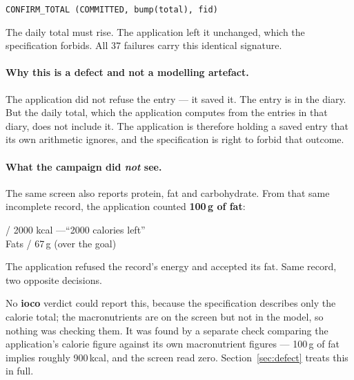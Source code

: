 \documentclass[11pt,a4paper]{article}
\newcommand{\gate}[1]{\texttt{\small #1}}
\begin{document}
\begin{center}
\gate{CONFIRM\_TOTAL (COMMITTED, bump(total), fid)}
\end{center}

\noindent The daily total must rise. The application left it unchanged, which the
specification forbids. All 37 failures carry this identical signature.

\paragraph{Why this is a defect and not a modelling artefact.}
The application did not refuse the entry --- it saved it. The entry is in the
diary. But the daily total, which the application computes from the entries in
that diary, does not include it. The application is therefore holding a saved
entry that its own arithmetic ignores, and the specification is right to forbid
that outcome.

\paragraph{What the campaign did \emph{not} see.}
The same screen also reports protein, fat and carbohydrate. From that same
incomplete record, the application counted \textbf{100\,g of fat}:

\begin{center}
 / 2000 kcal \quad---\quad ``2000 calories left'' \\
Fats  / 67\,g \quad(over the goal)
\end{center}

\noindent The application refused the record's energy and accepted its fat. Same
record, two opposite decisions.

No \textbf{ioco} verdict could report this, because the specification describes
only the calorie total; the macronutrients are on the screen but not in the
model, so nothing was checking them. It was found by a separate check comparing
the application's calorie figure against its own macronutrient figures ---
100\,g of fat implies roughly 900\,kcal, and the screen read zero.
Section~\ref{sec:defect} treats this in full.

\medskip
\noindent{}
\end{document}
